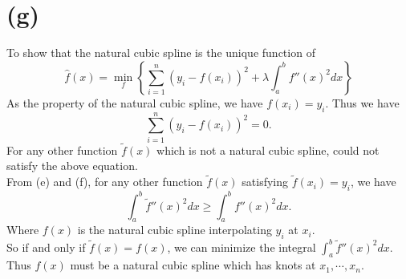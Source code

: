 \documentclass{article}
\begin{document}
\section*{(g)}
To show that the natural cubic spline is the unique function of
\begin{equation*}
    \hat{f}(x) = \min_{f} \left\{\sum_{i=1}^{n}(y_i - f(x_i))^2 + \lambda \int_{a}^{b} f''(x)^2dx \right\}
\end{equation*}
As the property of the natural cubic spline, we have $f(x_i) = y_i $. Thus we have
\begin{equation*}
    \sum_{i=1}^{n}(y_i - f(x_i))^2 = 0.
\end{equation*}
For any other function $\tilde{f}(x)$ which is not a natural cubic spline, could not satisfy the above equation. \\
From (e) and (f), for any other function $\tilde{f}(x)$ satisfying $\tilde{f}(x_i) = y_i$, we have
\begin{equation*}
    \int_{a}^{b} \tilde{f}''(x)^2dx \geq \int_{a}^{b} f''(x)^2dx.  
\end{equation*}
Where $f(x)$ is the natural cubic spline interpolating $y_i$ at $x_i$. \\
So if and only if $\tilde{f}(x) = f(x)$, we can minimize the integral $\int_{a}^{b} \tilde{f}''(x)^2dx$. \\
Thus $f(x)$ must be a natural cubic spline which has knots at $x_1, \cdots, x_n$.
\end{document}
